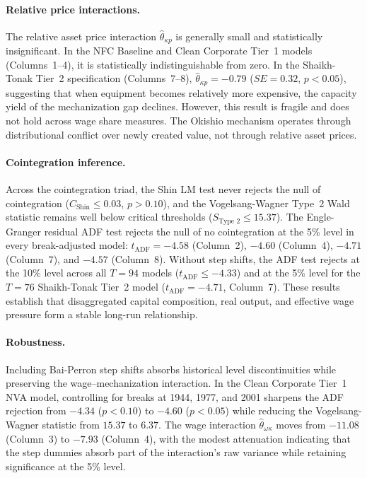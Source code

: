 \paragraph{Relative price interactions.}
The relative asset price interaction $\hat{\theta}_{\kappa p}$ is generally small and statistically insignificant. In the NFC Baseline and Clean Corporate Tier~1 models (Columns~1--4), it is statistically indistinguishable from zero. In the Shaikh-Tonak Tier~2 specification (Columns~7--8), $\hat{\theta}_{\kappa p} = -0.79$ ($SE = 0.32$, $p < 0.05$), suggesting that when equipment becomes relatively more expensive, the capacity yield of the mechanization gap declines. However, this result is fragile and does not hold across wage share measures. The Okishio mechanism operates through distributional conflict over newly created value, not through relative asset prices.

\paragraph{Cointegration inference.}
Across the cointegration triad, the Shin LM test never rejects the null of cointegration ($C_{\text{Shin}} \le 0.03$, $p > 0.10$), and the Vogelsang-Wagner Type~2 Wald statistic remains well below critical thresholds ($S_{\text{Type~2}} \le 15.37$). The Engle-Granger residual ADF test rejects the null of no cointegration at the 5\% level in every break-adjusted model: $t_{\text{ADF}} = -4.58$ (Column~2), $-4.60$ (Column~4), $-4.71$ (Column~7), and $-4.57$ (Column~8). Without step shifts, the ADF test rejects at the 10\% level across all $T = 94$ models ($t_{\text{ADF}} \le -4.33$) and at the 5\% level for the $T = 76$ Shaikh-Tonak Tier~2 model ($t_{\text{ADF}} = -4.71$, Column~7). These results establish that disaggregated capital composition, real output, and effective wage pressure form a stable long-run relationship.

\paragraph{Robustness.}
Including Bai-Perron step shifts absorbs historical level discontinuities while preserving the wage--mechanization interaction. In the Clean Corporate Tier~1 NVA model, controlling for breaks at 1944, 1977, and 2001 sharpens the ADF rejection from $-4.34$ ($p < 0.10$) to $-4.60$ ($p < 0.05$) while reducing the Vogelsang-Wagner statistic from $15.37$ to $6.37$. The wage interaction $\hat{\theta}_{\omega\kappa}$ moves from $-11.08$ (Column~3) to $-7.93$ (Column~4), with the modest attenuation indicating that the step dummies absorb part of the interaction's raw variance while retaining significance at the 5\% level.

